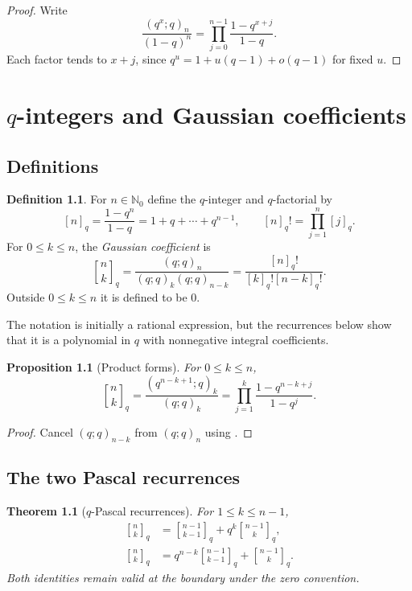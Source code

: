 \documentclass[11pt,oneside,openany]{book}
\newtheorem{theorem}{Theorem}[chapter]
\newtheorem{proposition}[proposition]{Proposition}
\theoremstyle{definition}
\newtheorem{definition}[definition]{Definition}
\theoremstyle{remark}
\newcommand{\qbinom}[2]{\genfrac{[}{]}{0pt}{}{#1}{#2}_{q}}
\newcommand{\N}{\mathbb N}
\begin{document}
\begin{proof}
Write
\[
 \frac{(q^x;q)_n}{(1-q)^n}
 =\prod_{j=0}^{n-1}\frac{1-q^{x+j}}{1-q}.
\]
Each factor tends to $x+j$, since $q^u=1+u(q-1)+o(q-1)$ for fixed $u$.
\end{proof}

\chapter{\texorpdfstring{$q$}{q}-integers and Gaussian coefficients}\label{chap:gaussian}

\section{Definitions}

\begin{definition}
For $n\in\N_0$ define the $q$-integer and $q$-factorial by
\[
 [n]_q=\frac{1-q^n}{1-q}=1+q+\cdots+q^{n-1},
 \qquad
 [n]_q!=\prod_{j=1}^{n}[j]_q.
\]
For $0\le k\le n$, the \emph{Gaussian coefficient} is
\[
 \qbinom nk
 =\frac{(q;q)_n}{(q;q)_k(q;q)_{n-k}}
 =\frac{[n]_q!}{[k]_q![n-k]_q!}.
\]
Outside $0\le k\le n$ it is defined to be $0$.
\end{definition}

The notation is initially a rational expression, but the recurrences below show that it is a polynomial in $q$ with nonnegative integral coefficients.

\begin{proposition}[Product forms]\label{prop:qbinom-products}
For $0\le k\le n$,
\[
 \qbinom nk
 =\frac{(q^{n-k+1};q)_k}{(q;q)_k}
 =\prod_{j=1}^{k}\frac{1-q^{n-k+j}}{1-q^j}.
\]
\end{proposition}

\begin{proof}
Cancel $(q;q)_{n-k}$ from $(q;q)_n$ using .
\end{proof}

\section{The two Pascal recurrences}

\begin{theorem}[$q$-Pascal recurrences]\label{thm:qpascal}
For $1\le k\le n-1$,
\begin{align}
 \qbinom nk&=\qbinom{n-1}{k-1}+q^k\qbinom{n-1}{k},\label{eq:qpascal1}\\
 \qbinom nk&=q^{n-k}\qbinom{n-1}{k-1}+\qbinom{n-1}{k}.\label{eq:qpascal2}
\end{align}
Both identities remain valid at the boundary under the zero convention.
\end{theorem}
\end{document}
